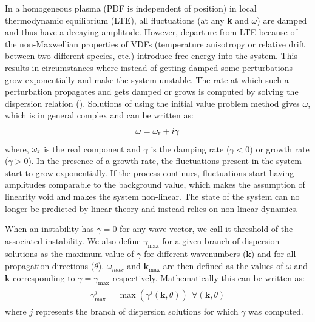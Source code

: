             In a homogeneous plasma (PDF is independent of position) in local thermodynamic
            equilibrium (LTE), all fluctuations (at any \textbf{k} and $\omega$) are damped and thus
            have a decaying amplitude. However, departure from LTE because of the non-Maxwellian
            properties of VDFs (temperature anisotropy or relative drift between two different
            species, etc.) introduce free energy into the system. This results in circumstances
            where instead of getting damped some perturbations grow exponentially and make the
            system unstable. The rate at which such a perturbation propagates and gets damped or
            grows is computed by solving the dispersion relation (). Solutions of
             using the initial value problem method gives $\omega$, which is in
            general complex and can be written as:
            \begin{align}
                \omega = \omega_{\rm r} + i \gamma \label{eq:omega}
            \end{align}
            where, $\omega_{\rm r}$ is the real component and $\gamma$ is the damping rate ($\gamma
            < 0$) or growth rate ($\gamma > 0$). In the presence of a growth rate, the fluctuations
            present in the system start to grow exponentially. If the process continues,
            fluctuations start having amplitudes comparable to the background value, which makes the
            assumption of linearity void and makes the system non-linear. The state of the system
            can no longer be predicted by linear theory and instead relies on non-linear dynamics.

            When an instability has $\gamma = 0$ for any wave vector, we call it threshold of the
            associated instability. We also define $\gamma_{\max}$ for a given branch of dispersion
            solutions as the maximum value of $\gamma$ for different wavenumbers ($\mathbf{k}$) and
            for all propagation directions ($\theta$). $\omega_{max}$ and $\mathbf{k}_{\max}$ are
            then defined as the values of $\omega$ and $\mathbf{k}$ corresponding to $\gamma =
            \gamma_{\max}$ respectively. Mathematically this can be written as:
            \begin{align}
                \begin{split}
                    \gamma_{\max}^j = \mathrm{\max}\left(\gamma^j\left(\mathbf{k},\theta\right)\right)~~\forall \left(\mathbf{k}, \theta\right) \label{eq:gammamax}
                \end{split}
            \end{align}
            where $j$ represents the branch of dispersion solutions for which $\gamma$ was computed.

